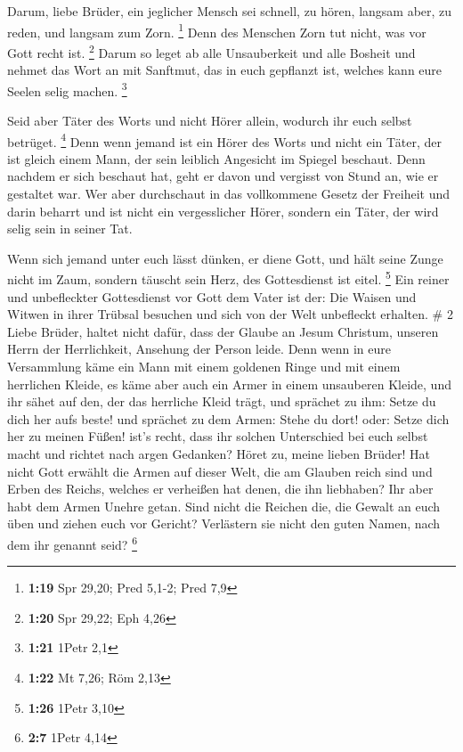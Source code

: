  Darum, liebe Brüder, ein jeglicher Mensch sei schnell,
zu hören, langsam aber, zu reden, und langsam zum Zorn. \footnote{\textbf{1:19}
  Spr 29,20; Pred 5,1-2; Pred 7,9}  Denn des Menschen
Zorn tut nicht, was vor Gott recht ist. \footnote{\textbf{1:20} Spr
  29,22; Eph 4,26}  Darum so leget ab alle Unsauberkeit
und alle Bosheit und nehmet das Wort an mit Sanftmut, das in euch
gepflanzt ist, welches kann eure Seelen selig machen. \footnote{\textbf{1:21}
  1Petr 2,1}

 Seid aber Täter des Worts und nicht Hörer allein,
wodurch ihr euch selbst betrüget. \footnote{\textbf{1:22} Mt 7,26; Röm
  2,13}  Denn wenn jemand ist ein Hörer des Worts und
nicht ein Täter, der ist gleich einem Mann, der sein leiblich Angesicht
im Spiegel beschaut.  Denn nachdem er sich beschaut hat,
geht er davon und vergisst von Stund an, wie er gestaltet war.
 Wer aber durchschaut in das vollkommene Gesetz der
Freiheit und darin beharrt und ist nicht ein vergesslicher Hörer,
sondern ein Täter, der wird selig sein in seiner Tat.

 Wenn sich jemand unter euch lässt dünken, er diene Gott,
und hält seine Zunge nicht im Zaum, sondern täuscht sein Herz, des
Gottesdienst ist eitel. \footnote{\textbf{1:26} 1Petr 3,10}
 Ein reiner und unbefleckter Gottesdienst vor Gott dem
Vater ist der: Die Waisen und Witwen in ihrer Trübsal besuchen und sich
von der Welt unbefleckt erhalten. \# 2  Liebe Brüder,
haltet nicht dafür, dass der Glaube an Jesum Christum, unseren Herrn der
Herrlichkeit, Ansehung der Person leide.  Denn wenn in
eure Versammlung käme ein Mann mit einem goldenen Ringe und mit einem
herrlichen Kleide, es käme aber auch ein Armer in einem unsauberen
Kleide,  und ihr sähet auf den, der das herrliche Kleid
trägt, und sprächet zu ihm: Setze du dich her aufs beste! und sprächet
zu dem Armen: Stehe du dort! oder: Setze dich her zu meinen Füßen!
 ist's recht, dass ihr solchen Unterschied bei euch selbst
macht und richtet nach argen Gedanken?  Höret zu, meine
lieben Brüder! Hat nicht Gott erwählt die Armen auf dieser Welt, die am
Glauben reich sind und Erben des Reichs, welches er verheißen hat denen,
die ihn liebhaben?  Ihr aber habt dem Armen Unehre getan.
Sind nicht die Reichen die, die Gewalt an euch üben und ziehen euch vor
Gericht?  Verlästern sie nicht den guten Namen, nach dem
ihr genannt seid? \footnote{\textbf{2:7} 1Petr 4,14}

